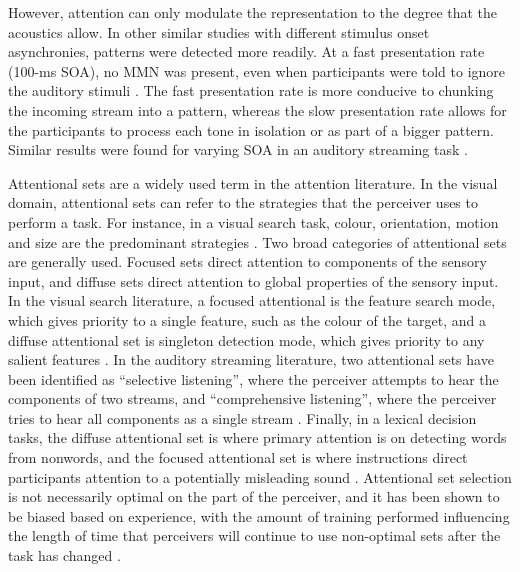 However, attention can only modulate the representation to the degree that the acoustics allow.
In other similar studies with different stimulus onset asynchronies, patterns were detected more readily.
At a fast presentation rate (100-ms SOA), no MMN was present, even when participants were told to ignore the auditory stimuli \citep{Sussman1998}.
The fast presentation rate is more conducive to chunking the incoming stream into a pattern, whereas the slow presentation rate allows for the participants to process each tone in isolation or as part of a bigger pattern.
Similar results were found for varying SOA in an auditory streaming task \citep{Sussman1998,Sussman1998a}.

Attentional sets are a widely used term in the attention literature.  
In the visual domain, attentional sets can refer to the strategies that the perceiver uses to perform a task.  
For instance, in a visual search task, colour, orientation, motion and size are the predominant strategies \citep{Wolfe2004}.  
Two broad categories of attentional sets are generally used.  
Focused sets direct attention to components of the sensory input, and diffuse sets direct attention to global properties of the sensory input.  
In the visual search literature, a focused attentional is the feature search mode, which gives priority to a single feature, such as the colour of the target, and a diffuse attentional set is singleton detection mode, which gives priority to any salient features \citep{Bacon1994}. 
In the auditory streaming literature, two attentional sets have been identified as ``selective listening'', where the perceiver attempts to hear the components of two streams, and ``comprehensive listening'', where the perceiver tries to hear all components as a single stream  \citep{vanNoorden1975}.
Finally, in a lexical decision tasks, the diffuse attentional set is where primary attention is on detecting words from nonwords, and the focused attentional set is where instructions direct participants attention to a potentially misleading sound \citep{Pitt2012}.
Attentional set selection is not necessarily optimal on the part of the perceiver, and it has been shown to be biased based on experience, with the amount of training performed influencing the length of time that perceivers will continue to use non-optimal sets after the task has changed \citep{Leber2006}.  

